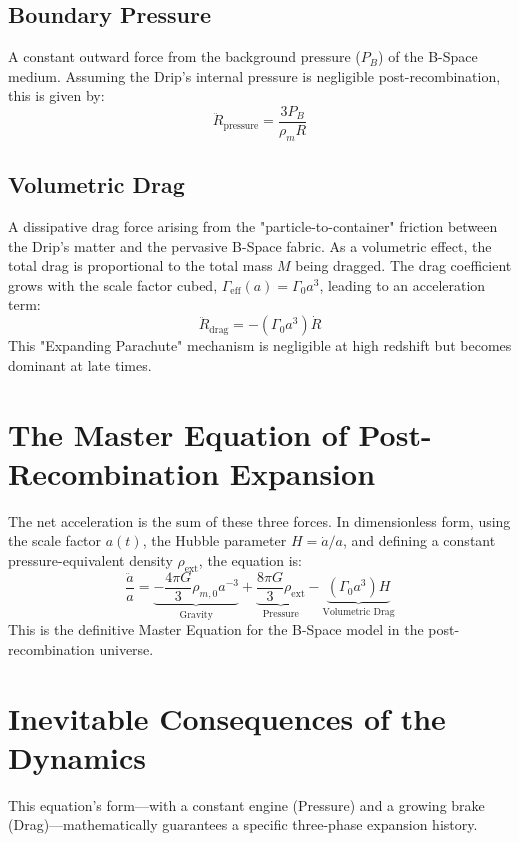 \documentclass{BSpacePaper} %
\begin{document}
\subsection{Boundary Pressure}
A constant outward force from the background pressure ($P_B$) of the B-Space medium. Assuming the Drip's internal pressure is negligible post-recombination, this is given by:
\begin{equation}
    \ddot{R}_{\text{pressure}} = \frac{3P_B}{\rho_m R}
\end{equation}

\subsection{Volumetric Drag}
A dissipative drag force arising from the "particle-to-container" friction between the Drip's matter and the pervasive B-Space fabric. As a volumetric effect, the total drag is proportional to the total mass $M$ being dragged. The drag coefficient grows with the scale factor cubed, $\Gamma_{\text{eff}}(a) = \Gamma_0 a^3$, leading to an acceleration term:
\begin{equation}
    \ddot{R}_{\text{drag}} = -(\Gamma_0 a^3)\dot{R}
\end{equation}
This "Expanding Parachute" mechanism is negligible at high redshift but becomes dominant at late times.

\section{The Master Equation of Post-Recombination Expansion}
The net acceleration is the sum of these three forces. In dimensionless form, using the scale factor $a(t)$, the Hubble parameter $H = \dot{a}/a$, and defining a constant pressure-equivalent density $\rho_{\text{ext}}$, the equation is:
\begin{equation} \label{eq:master}
\boxed{
\frac{\ddot{a}}{a} = 
\underbrace{-\frac{4\pi G}{3} \rho_{m,0} a^{-3}}_{\text{Gravity}} 
+ \underbrace{\frac{8\pi G}{3} \rho_{\text{ext}}}_{\text{Pressure}} 
- \underbrace{(\Gamma_{0} a^3) H}_{\text{Volumetric Drag}}
}
\end{equation}
This is the definitive Master Equation for the B-Space model in the post-recombination universe.

\section{Inevitable Consequences of the Dynamics}
This equation's form—with a constant engine (Pressure) and a growing brake (Drag)—mathematically guarantees a specific three-phase expansion history.
\end{document}
